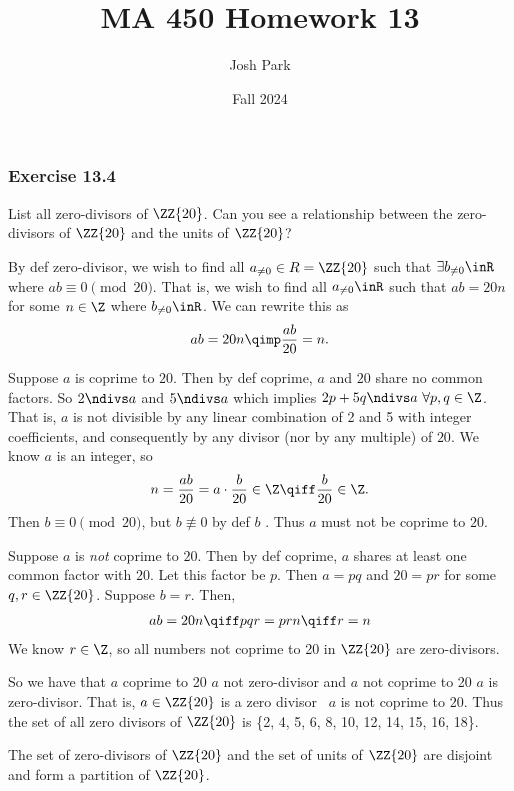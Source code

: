 \documentclass{article}
\author{Josh Park}
\date{\vspace*{-1em}Fall 2024}
\title{\vspace*{-2em}MA 450 Homework 13\vspace*{-1em}}
\begin{document}
\maketitle

\subsubsection*{Exercise 13.4}
List all zero-divisors of \( \ZZ{20} \). Can you see a relationship between the zero-divisors of \( \ZZ{20} \) and the units of \( \ZZ{20} \)?

\begin{solution} %
  By def zero-divisor, we wish to find all \( a_{\neq 0}\in R = \ZZ{20} \) such that \( \exists b_{\neq 0} \inR \) where \( ab\equiv 0 \pmod{20} \).
  That is, we wish to find all \( a_{\neq 0} \inR \) such that \( ab = 20n \) for some \( n\in\Z \) where \( b_{\neq 0}\inR \).
  We can rewrite this as
  \begin{align*}
    ab = 20n \qimp \frac{ab}{20} = n.
  \end{align*}

  Suppose \( a \) is coprime to \( 20 \). Then by def coprime, \( a \) and \( 20 \) share no common factors.
  So \( 2\ndivs a \) and \( 5\ndivs a \) which implies \( 2p+5q\ndivs a\ \forall p,q\in\Z \).
  That is, \( a \) is not divisible by any linear combination of 2 and 5 with integer coefficients, and consequently by any divisor (nor by any multiple) of \( 20 \). We know \( a \) is an integer, so
  \begin{align*}
    n = \frac{ab}{20} = a \cdot \frac{b}{20}\in\Z \qiff \frac{b}{20}\in\Z.
  \end{align*}
  Then \( b \equiv 0\pmod{20} \), but \( b\not\equiv 0 \) by def \( b \) \contradiction. Thus \( a \) must not be coprime to \( 20 \).

  Suppose \( a \) is \emph{not} coprime to \( 20 \). Then by def coprime, \( a \) shares at least one common factor with \( 20 \). Let this factor be \( p \). Then \( a = pq \) and \( 20 = pr \) for some \(q,r \in\ZZ{20} \). Suppose \( b = r \). Then,
  \begin{align*}
    ab = 20n \qiff pqr = prn \qiff r = n
  \end{align*}
  We know \( r\in\Z \), so all numbers not coprime to 20 in \( \ZZ{20} \) are zero-divisors.

  So we have that \( a \) coprime to 20 \imp \( a \) not zero-divisor and \( a \) not coprime to 20 \imp \( a \) is zero-divisor. That is, \( a\in\ZZ{20} \) is a zero divisor \iff\ \( a \) is not coprime to \( 20 \). Thus the set of all zero divisors of \( \ZZ{20} \) is \{2, 4, 5, 6, 8, 10, 12, 14, 15, 16, 18\}.

  The set of zero-divisors of \( \ZZ{20} \) and the set of units of \( \ZZ{20} \) are disjoint and form a partition of \( \ZZ{20} \).
\end{solution}
\end{document}
